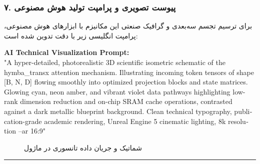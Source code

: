 \subsubsection*{۷. پیوست تصویری و پرامپت تولید هوش مصنوعی}
برای ترسیم تجسم سه‌بعدی و گرافیک صنعتی این مکانیزم با ابزارهای هوش مصنوعی، پرامپت انگلیسی زیر با دقت تدوین شده است:

\vspace{0.2cm}
\begin{latin}
\footnotesize
\textbf{AI Technical Visualization Prompt:}\\
"A hyper-detailed, photorealistic 3D scientific isometric schematic of the hymba\_transx attention mechanism. Illustrating incoming token tensors of shape [B, N, D] flowing smoothly into optimized projection blocks and state matrices. Glowing cyan, neon amber, and vibrant violet data pathways highlighting low-rank dimension reduction and on-chip SRAM cache operations, contrasted against a dark metallic blueprint background. Clean technical typography, publication-grade academic rendering, Unreal Engine 5 cinematic lighting, 8k resolution --ar 16:9"
\end{latin}

\begin{figure}[H]
    \centering
    \caption{شماتیک و جریان داده تانسوری در ماژول }
    \label{fig:hymba_transx}
\end{figure}

\vspace{0.5cm}
\hrule
\vspace{0.5cm}
